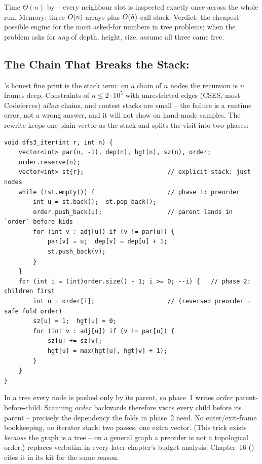 \begin{complexitybox}
Time $\Theta(n)$ by  -- every neighbour slot is inspected exactly
once across the whole run. Memory: three $O(n)$ arrays plus $O(h)$ call stack.
Verdict: the cheapest possible engine for the most asked-for numbers in tree problems;
when the problem asks for \emph{any} of depth, height, size, assume all three came free.
\end{complexitybox}

\subsection{The Chain That Breaks the Stack: }

's honest fine print is the stack term: on a chain of $n$ nodes the
recursion is $n$ frames deep. Constraints of $n \le 2\cdot 10^{5}$ with unrestricted edges
(CSES, most Codeforces) \emph{allow} chains, and contest stacks are small -- the failure
is a runtime error, not a wrong answer, and it will not show on hand-made samples. The
rewrite keeps one plain vector as the stack and splits the visit into two phases:

\begin{lstlisting}[caption={Iterative DFS: preorder to plant depth, reversed replay to finish height and size (the rewrite Chapter 16's kit cites for $5\cdot 10^{5}$-node chains)}, label={lst:c09-iter}]
void dfs3_iter(int r, int n) {
    vector<int> par(n, -1), dep(n), hgt(n), sz(n), order;
    order.reserve(n);
    vector<int> st{r};                       // explicit stack: just nodes
    while (!st.empty()) {                    // phase 1: preorder
        int u = st.back();  st.pop_back();
        order.push_back(u);                  // parent lands in `order` before kids
        for (int v : adj[u]) if (v != par[u]) {
            par[v] = u;  dep[v] = dep[u] + 1;
            st.push_back(v);
        }
    }
    for (int i = (int)order.size() - 1; i >= 0; --i) {   // phase 2: children first
        int u = order[i];                    // (reversed preorder = safe fold order)
        sz[u] = 1;  hgt[u] = 0;
        for (int v : adj[u]) if (v != par[u]) {
            sz[u] += sz[v];
            hgt[u] = max(hgt[u], hgt[v] + 1);
        }
    }
}
\end{lstlisting}

\begin{notebox}
In a tree every node is pushed only by its parent, so phase~1 writes $\mathit{order}$
parent-before-child. Scanning $\mathit{order}$ backwards therefore visits every child
before its parent -- precisely the dependency the folds in phase~2 need. No
enter/exit-frame bookkeeping, no iterator stack: two passes, one extra vector. (This
trick exists \emph{because} the graph is a tree -- on a general graph a preorder is not a
topological order.)  replaces  verbatim in every
later chapter's budget analysis; Chapter~16 () cites it in its kit for the
same reason.
\end{notebox}


